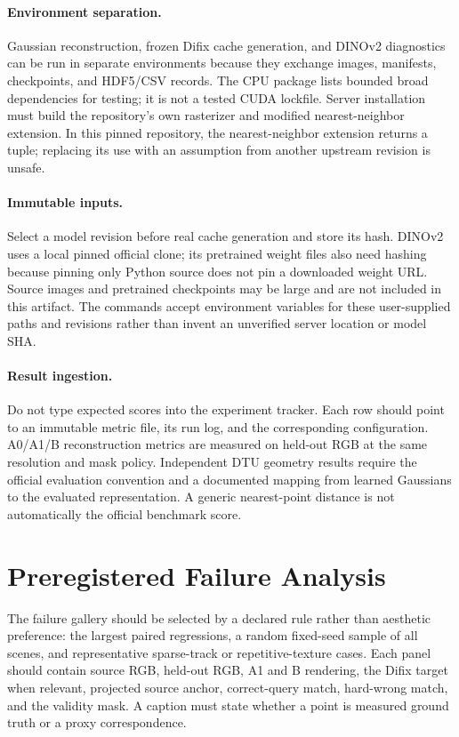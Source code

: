 \documentclass[10pt,twocolumn,letterpaper]{article}
\begin{document}
\paragraph{Environment separation.} Gaussian reconstruction, frozen Difix cache generation, and DINOv2 diagnostics can be run in separate environments because they exchange images, manifests, checkpoints, and HDF5/CSV records. The CPU package lists bounded broad dependencies for testing; it is not a tested CUDA lockfile. Server installation must build the repository's own rasterizer and modified nearest-neighbor extension. In this pinned repository, the nearest-neighbor extension returns a tuple; replacing its use with an assumption from another upstream revision is unsafe.

\paragraph{Immutable inputs.} Select a model revision before real cache generation and store its hash. DINOv2 uses a local pinned official clone; its pretrained weight files also need hashing because pinning only Python source does not pin a downloaded weight URL. Source images and pretrained checkpoints may be large and are not included in this artifact. The commands accept environment variables for these user-supplied paths and revisions rather than invent an unverified server location or model SHA.

\paragraph{Result ingestion.} Do not type expected scores into the experiment tracker. Each row should point to an immutable metric file, its run log, and the corresponding configuration. A0/A1/B reconstruction metrics are measured on held-out RGB at the same resolution and mask policy. Independent DTU geometry results require the official evaluation convention and a documented mapping from learned Gaussians to the evaluated representation. A generic nearest-point distance is not automatically the official benchmark score.

\section{Preregistered Failure Analysis}
The failure gallery should be selected by a declared rule rather than aesthetic preference: the largest paired regressions, a random fixed-seed sample of all scenes, and representative sparse-track or repetitive-texture cases. Each panel should contain source RGB, held-out RGB, A1 and B rendering, the Difix target when relevant, projected source anchor, correct-query match, hard-wrong match, and the validity mask. A caption must state whether a point is measured ground truth or a proxy correspondence.
\end{document}
